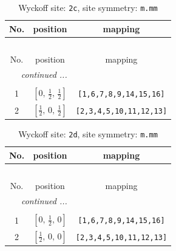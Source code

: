 \documentclass[fleqn,8pt]{jsarticle}
\begin{document}
\renewcommand{\arraystretch}{1.2}
\begin{longtable}{ccc}
\caption{Wyckoff site: {\tt 2c}, site symmetry: {\tt m.mm}}
 \\
 \hline \hline
No. & position & mapping \\ \hline \endfirsthead

\multicolumn{2}{l}{\tablename\ \thetable{}} \\
 \hline \hline
No. & position & mapping \\ \hline \endhead

 \hline \hline
\multicolumn{2}{r}{\footnotesize\it continued ...} \\ \endfoot

 \hline \hline
\multicolumn{2}{r}{} \\ \endlastfoot

1 & $\left[ 0,\, \frac{1}{2},\, \frac{1}{2} \right]$ & {\tt [1,6,7,8,9,14,15,16]} \\ \hline
2 & $\left[ \frac{1}{2},\, 0,\, \frac{1}{2} \right]$ & {\tt [2,3,4,5,10,11,12,13]} \\
\end{longtable}
\renewcommand{\arraystretch}{1.2}
\begin{longtable}{ccc}
\caption{Wyckoff site: {\tt 2d}, site symmetry: {\tt m.mm}}
 \\
 \hline \hline
No. & position & mapping \\ \hline \endfirsthead

\multicolumn{2}{l}{\tablename\ \thetable{}} \\
 \hline \hline
No. & position & mapping \\ \hline \endhead

 \hline \hline
\multicolumn{2}{r}{\footnotesize\it continued ...} \\ \endfoot

 \hline \hline
\multicolumn{2}{r}{} \\ \endlastfoot

1 & $\left[ 0,\, \frac{1}{2},\, 0 \right]$ & {\tt [1,6,7,8,9,14,15,16]} \\ \hline
2 & $\left[ \frac{1}{2},\, 0,\, 0 \right]$ & {\tt [2,3,4,5,10,11,12,13]} \\
\end{longtable}
\renewcommand{\arraystretch}{1.2}
\end{document}

